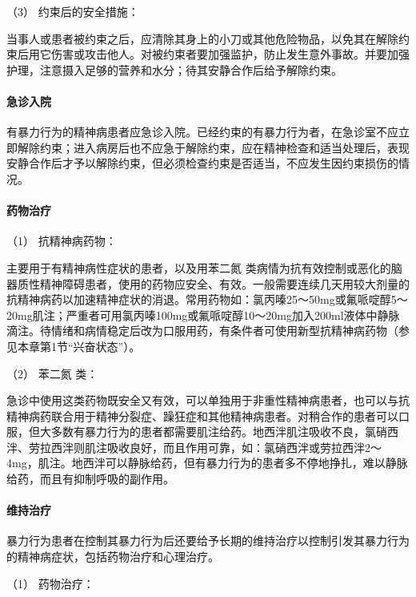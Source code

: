 \hypertarget{text00054.htmlux5cux23CHP1-18-12-3-3-3}{}
（3） 约束后的安全措施：

当事人或患者被约束之后，应清除其身上的小刀或其他危险物品，以免其在解除约束后用它伤害或攻击他人。对被约束者要加强监护，防止发生意外事故。并要加强护理，注意摄入足够的营养和水分；待其安静合作后给予解除约束。

\paragraph{急诊入院}

有暴力行为的精神病患者应急诊入院。已经约束的有暴力行为者，在急诊室不应立即解除约束；进入病房后也不应急于解除约束，应在精神检查和适当处理后，表现安静合作后才予以解除约束，但必须检查约束是否适当，不应发生因约束损伤的情况。

\paragraph{药物治疗}

\hypertarget{text00054.htmlux5cux23CHP1-18-12-3-5-1}{}
（1） 抗精神病药物：

主要用于有精神病性症状的患者，以及用苯二氮{}
类病情为抗有效控制或恶化的脑器质性精神障碍患者，使用的药物应安全、有效。一般需要连续几天用较大剂量的抗精神病药以加速精神症状的消退。常用药物如：氯丙嗪25～50mg或氟哌啶醇5～20mg肌注；严重者可用氯丙嗪100mg或氟哌啶醇10～20mg加入200ml液体中静脉滴注。待情绪和病情稳定后改为口服用药，有条件者可使用新型抗精神病药物（参见本章第1节“兴奋状态”）。

\hypertarget{text00054.htmlux5cux23CHP1-18-12-3-5-2}{}
（2） 苯二氮{} 类：

急诊中使用这类药物既安全又有效，可以单独用于非重性精神病患者，也可以与抗精神病药联合用于精神分裂症、躁狂症和其他精神病患者。对稍合作的患者可以口服，但大多数有暴力行为的患者都需要肌注给药。地西泮肌注吸收不良，氯硝西泮、劳拉西泮则肌注吸收良好，而且作用可靠，如：氯硝西泮或劳拉西泮2～
4mg，肌注。地西泮可以静脉给药，但有暴力行为的患者多不停地挣扎，难以静脉给药，而且有抑制呼吸的副作用。

\paragraph{维持治疗}

暴力行为患者在控制其暴力行为后还要给予长期的维持治疗以控制引发其暴力行为的精神病症状，包括药物治疗和心理治疗。

\hypertarget{text00054.htmlux5cux23CHP1-18-12-3-6-1}{}
（1） 药物治疗：

